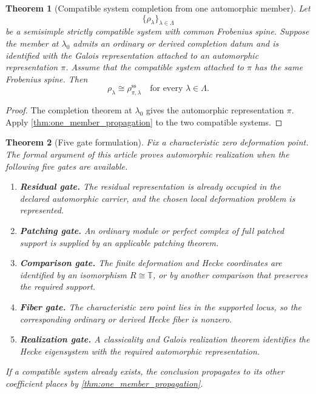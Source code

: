 \documentclass{aomart}
\newtheorem{theorem}{Theorem}[section]
\theoremstyle{definition}
\theoremstyle{remark}
\newcommand{\TT}{\mathbb T}
\begin{document}
\begin{theorem}[Compatible system completion from one automorphic member]\label{thm:system_completion}
Let
\[
\{\rho_\lambda\}_{\lambda\in\Lambda}
\]
be a semisimple strictly compatible system with common Frobenius spine. Suppose the member at \(\lambda_0\) admits an ordinary or derived completion datum and is identified with the Galois representation attached to an automorphic representation \(\pi\). Assume that the compatible system attached to \(\pi\) has the same Frobenius spine. Then
\[
\boxed{
\rho_\lambda
\cong
\rho_{\pi,\lambda}^{\mathrm{ss}}
\quad
\text{for every }\lambda\in\Lambda.
}
\]
\end{theorem}

\begin{proof}
The completion theorem at \(\lambda_0\) gives the automorphic representation \(\pi\). Apply \cref{thm:one_member_propagation} to the two compatible systems.
\end{proof}

\begin{theorem}[Five gate formulation]\label{thm:five_gate_completion}
Fix a characteristic zero deformation point. The formal argument of this article proves automorphic realization when the following five gates are available.
\begin{enumerate}
\item \textbf{Residual gate.} The residual representation is already occupied in the declared automorphic carrier, and the chosen local deformation problem is represented.
\item \textbf{Patching gate.} An ordinary module or perfect complex of full patched support is supplied by an applicable patching theorem.
\item \textbf{Comparison gate.} The finite deformation and Hecke coordinates are identified by an isomorphism \(R\cong\TT\), or by another comparison that preserves the required support.
\item \textbf{Fiber gate.} The characteristic zero point lies in the supported locus, so the corresponding ordinary or derived Hecke fiber is nonzero.
\item \textbf{Realization gate.} A classicality and Galois realization theorem identifies the Hecke eigensystem with the required automorphic representation.
\end{enumerate}
If a compatible system already exists, the conclusion propagates to its other coefficient places by \cref{thm:one_member_propagation}.
\end{theorem}
\end{document}

